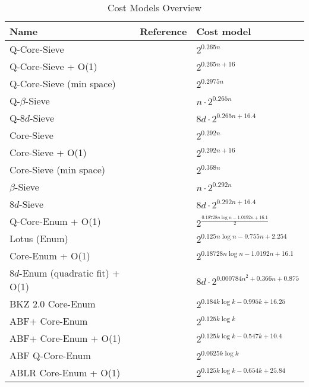 \begin{table}
  \centering
  \begin{tabular}{lll}
    \toprule
    Name & Reference & Cost model \\\hline
    Q-Core-Sieve & \cite{Laa15,ADPS16,AGPS20} & $2^{0.265n}$\\
    Q-Core-Sieve + O(1) & \cite{SAL+17} & $2^{0.265n + 16}$\\
    Q-Core-Sieve (min space) & \cite{SHRS17} & $2^{0.2975n}$\\
    Q-$\beta$-Sieve & \cite{NAB+17} & $n \cdot 2^{0.265n}$\\
    Q-$8d$-Sieve & \cite{BAA+17} & $8d \cdot 2^{0.265n + 16.4}$\\
    Core-Sieve & \cite{BDGL16,ADPS16,AGPS20} & $2^{0.292n}$\\
    Core-Sieve + O(1) & \cite{SAL+17} & $2^{0.292n + 16}$\\
    Core-Sieve (min space) & \cite{SHRS17} & $2^{0.368n}$\\
    $\beta$-Sieve & \cite{NAB+17} & $n \cdot 2^{0.292n}$\\
    $8d$-Sieve & \cite{DTGW17} & $8d \cdot 2^{0.292n + 16.4}$\\
    Q-Core-Enum + O(1)& \cite{SHRS17, Chen13,ACDDPPVW18} & $2^{\frac{0.18728n \log n - 1.0192 n + 16.1}{2}}$\\
    Lotus (Enum)& \cite{PHAM17, ACDDPPVW18} & $2^{0.125n \log n - 0.755 n + 2.254}$\\
    Core-Enum + O(1)& \cite{SHRS17, Chen13,ACDDPPVW18} & $2^{0.18728n \log n - 1.0192 n + 16.1}$\\
    $8d$-Enum (quadratic fit) + O(1) & \cite{BC0V17} & $8d \cdot 2^{0.000784 n^2 + 0.366 n + 0.875}$\\
    BKZ 2.0 Core-Enum & \cite{CN11, Chen13, ABFKSW20} & $2^{0.184k \log k - 0.995k + 16.25}$\\
    ABF+ Core-Enum & \cite{ABFKSW20} & $2^{0.125k \log k}$\\
    ABF+ Core-Enum + O(1)& \cite{ABFKSW20} & $2^{0.125k \log k - 0.547k + 10.4}$\\
    ABF Q-Core-Enum & \cite{ABFKSW20} & $2^{0.0625 k \log k}$ \\
    ABLR Core-Enum + O(1)& \cite{ABLR21} & $2^{0.125k \log k - 0.654k + 25.84}$ \\
    \bottomrule
  \end{tabular}
  \caption{Cost Models Overview} %
  \label{tab:costmodels}
\end{table} %



